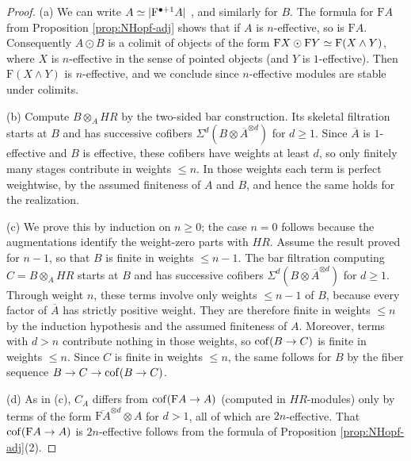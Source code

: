 \documentclass{amsart}
\numberwithin{proposition}{section}
\numberwithin{equation}{section}
\def\Free{\mathrm{F}}
\def\hotimes{\odot}
\begin{document}
\begin{proof}
(a) We can write $A \wequi |\Free^{\bullet+1} A|$ \cite[Proposition~4.7.3.14]{lurie-ha}, and similarly for $B$.
The formula for $\Free A$ from Proposition \ref{prop:NHopf-adj} shows that if $A$ is $n$-effective, so is $\Free A$.
Consequently $A \hotimes B$ is a colimit of objects of the form $\Free X \hotimes \Free Y \wequi \Free(X \wedge Y)$, where $X$ is $n$-effective in the sense of pointed objects (and $Y$ is $1$-effective).
Then $\Free(X \wedge Y)$ is $n$-effective, and we conclude since $n$-effective modules are stable under colimits.

(b) Compute $B\otimes_A HR$ by the two-sided bar construction.
Its skeletal filtration starts at $B$ and has successive cofibers $\Sigma^d(B\otimes\overline{A}^{\otimes d})$ for $d\ge1$.
Since $\overline{A}$ is $1$-effective and $B$ is effective, these cofibers have weights at least $d$, so only finitely many stages contribute in weights $\le n$.
In those weights each term is perfect weightwise, by the assumed finiteness of $A$ and $B$, and hence the same holds for the realization.

(c) We prove this by induction on $n\ge0$; the case $n=0$ follows because the augmentations identify the weight-zero parts with $HR$.
Assume the result proved for $n-1$, so that $B$ is finite in weights $\le n-1$.
The bar filtration computing $C=B\otimes_A HR$ starts at $B$ and has successive cofibers $\Sigma^d(B\otimes\overline{A}^{\otimes d})$ for $d\ge1$.
Through weight $n$, these terms involve only weights $\le n-1$ of $B$, because every factor of $\overline{A}$ has strictly positive weight.
They are therefore finite in weights $\le n$ by the induction hypothesis and the assumed finiteness of $A$.
Moreover, terms with $d>n$ contribute nothing in those weights, so $\operatorname{cof}(B\to C)$ is finite in weights $\le n$.
Since $C$ is finite in weights $\le n$, the same follows for $B$ by the fiber sequence $B\to C\to\operatorname{cof}(B\to C)$.

(d) As in (c), $C_A$ differs from $\cof(\Free A \to A)$ (computed in $HR$-modules) only by terms of the form $\overline{\Free A}^{\otimes d} \otimes A$ for $d > 1$, all of which are $2n$-effective.
That $\cof(\Free A \to A)$ is $2n$-effective follows from the formula of Proposition \ref{prop:NHopf-adj}(2).


\end{proof}
\end{document}
